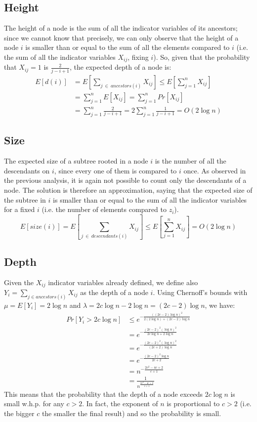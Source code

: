 \documentclass{article}
\begin{document}
\subsection{Height}
The height of a node is the sum of all the indicator variables of its ancestors; since we cannot know that precisely, we can only observe that the height of a node $i$ is smaller than or equal to the sum of all the elements compared to $i$ (i.e. the sum of all the indicator variables $X_{ij}$, fixing $i$). So, given that the probability that $X_{ij}=1$ is $\frac{2}{j-i+1}$, the expected depth of a node is: 
\begin{align*}
E\left[d\left(i\right)\right]
&=E\left[\sum_{j\ \in\ ancestors(i)}X_{ij}\right]\leq E\left[\sum_{j=1}^{n}X_{ij}\right]\\
&=\sum_{j=1}^{n} E\left[X_{ij}\right]=\sum_{j=1}^{n} Pr\left[X_{ij}\right]\\
&=\sum_{j=1}^{n} \frac{2}{j-i+1}=2\sum_{j=1}^{n} \frac{1}{j-i+1}=O(2\log n)
\end{align*}

\newpage
\subsection{Size}
The expected size of a subtree rooted in a node $i$ is the number of all the descendants on $i$, since every one of them is compared to $i$ once. As observed in the previous analysis, it is again not possible to count only the descendants of a node. The solution is therefore an approximation, saying that the expected size of the subtree in $i$ is smaller than or equal to the sum of all the indicator variables for a fixed $i$ (i.e. the number of elements compared to $z_i$). $$E\left[size\left(i\right)\right]=E\left[\sum_{j\ \in\ descendants(i)}X_{ij}\right]\leq E\left[\sum_{j=1}^{n}X_{ij}\right]=O(2\log n)$$

\subsection{Depth}
Given the $X_{ij}$ indicator variables already defined, we define also $Y_i=\sum_{j\in ancestors(i)}X_{ij}$ as the depth of a node $i$. Using Chernoff's bounds with $\mu=E[Y_i]=2\log n$ and $\lambda = 2c\log n-2\log n = (2c-2)\log n$, we have:
\begin{align*}
Pr\left[Y_i > 2c\log n\right] &\leq e^{-\frac{((2c-2)\log n)^2}{2(2\log n)+(2c-2)\log n}}\\
&= e^{-\frac{(2c-2)^2(\log n)^2}{2c\log n + 2\log n}}\\
&= e^{-\frac{(2c-2)^2(\log n)^2}{(2c+2)\log n}}\\
&= e^{-\frac{(2c-2)^2\log n}{2c+2}}\\
&= n^{-\frac{2c^2-4c+2}{c+1}}\\
&= \frac{1}{n^{\frac{2c^2-4c+2}{c+1}}}
\end{align*}
This means that the probability that the depth of a node exceeds $2c\log n$ is small w.h.p. for any $c>2$. In fact, the exponent of $n$ is proportional to $c>2$ (i.e. the bigger $c$ the smaller the final result) and so the probability is small.
\end{document}
